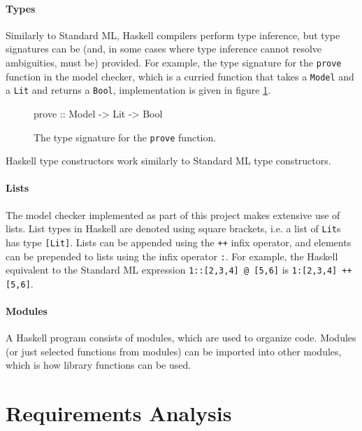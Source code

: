 \documentclass[12pt,a4paper,twoside,openright]{report}
\begin{document}
\paragraph{Types}{
Similarly to Standard ML, Haskell compilers perform type inference, but type
signatures can be (and, in some cases where type inference cannot resolve
ambiguities, must be) provided. For example, the type signature for the
\verb,prove, function in the model checker, which is a curried function
that takes a \verb,Model, and a \verb,Lit, and returns a \verb,Bool,,
implementation is given in figure \ref{typesigexample}.

\begin{figure}[ht!]
\begin{listing}
prove :: Model -> Lit -> Bool
\end{listing}
\caption{The type signature for the {\tt prove} function.}
\label{typesigexample}
\end{figure}

Haskell type constructors work similarly to Standard ML type constructors.
}

\paragraph{Lists}{
The model checker implemented as part of this project makes extensive use
of lists. List types in Haskell are denoted using square brackets, i.e.
a list of \verb,Lit,s has type \verb,[Lit],.
Lists can be appended using the \verb,++, infix operator, and elements
can be prepended to lists using the infix operator \verb,:,. For
example, the Haskell equivalent to the Standard ML expression \verb.1::[2,3,4] @ [5,6].
is \verb.1:[2,3,4] ++ [5,6]..}

\paragraph{Modules}{
A Haskell program consists of modules, which are used to organize code.
Modules (or just selected functions from modules) can be imported into other
modules, which is how library functions can be used.
}

\section{Requirements Analysis}

\end{document}
